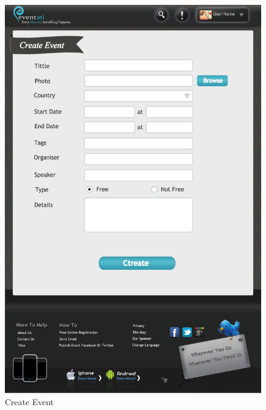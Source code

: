\documentclass[12pt,a4paper,class,twoside,openany]{report}
\begin{document}
{\begin{figure}
\begin{center}
\includegraphics[height=8 in]{8-3}
\caption{Create Event}
\label{fg:8-3}
\end{center}
\end{figure}
\begin{figure}
\begin{center}

\end{center}
\end{figure}}
\end{document}
